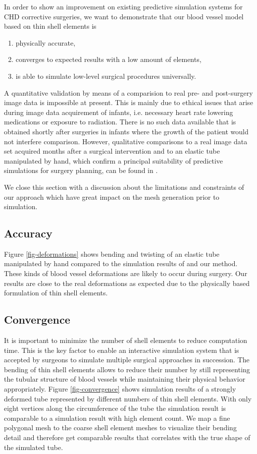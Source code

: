 In order to show an improvement on existing predictive simulation systems for CHD corrective surgeries, we want to demonstrate that our blood vessel model based on thin shell elements is
\begin{enumerate}
\item physically accurate,
\item converges to expected results with a low amount of elements,
\item is able to simulate low-level surgical procedures universally.
\end{enumerate}
A quantitative validation by means of a comparision to real pre- and post-surgery image data is impossible at present. This is mainly due to ethical issues that arise during image data acquirement of infants, i.e. necessary heart rate lowering medications or exposure to radiation. There is no such data available that is obtained shortly after surgeries in infants where the growth of the patient would not interfere comparison. However, qualitative comparisons to a real image data set acquired months after a surgical intervention and to an elastic tube manipulated by hand, which confirm a principal suitability of predictive simulations for surgery planning, can be found in \cite{Li2009}.

We close this section with a discussion about the limitations and constraints of our approach which have great impact on the mesh generation prior to simulation.

\subsection{Accuracy}

Figure \ref{fig-deformations} shows bending and twisting of an elastic tube manipulated by hand compared to the simulation results of \cite{Li2009} and our method. These kinds of blood vessel deformations are likely to occur during surgery. Our results are close to the real deformations as expected due to the physically based formulation of thin shell elements.

\subsection{Convergence}

It is important to minimize the number of shell elements to reduce computation time. This is the key factor to enable an interactive simulation system that is accepted by surgeons to simulate multiple surgical approaches in succession. The bending of thin shell elements allows to reduce their number by still representing the tubular structure of blood vessels while maintaining their physical behavior appropriately. Figure \ref{fig-convergence} shows simulation results of a strongly deformed tube represented by different numbers of thin shell elements. With only eight vertices along the circumference of the tube the simulation result is comparable to a simulation result with high element count. We map a fine polygonal mesh to the coarse shell element meshes to visualize their bending detail and therefore get comparable results that correlates with the true shape of the simulated tube.

